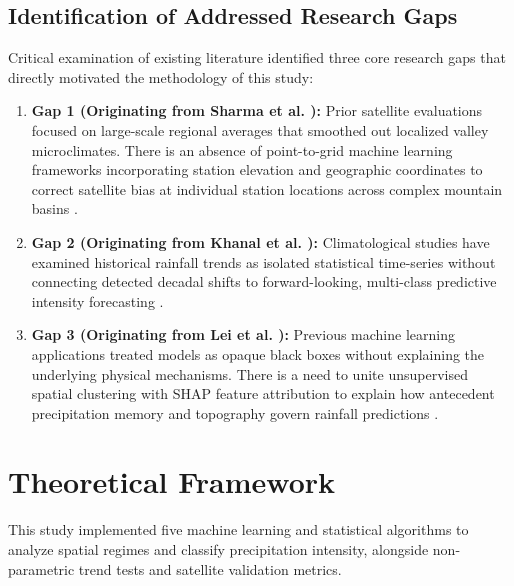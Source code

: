 \documentclass[conference]{IEEEtran}
\begin{document}
\subsection{Identification of Addressed Research Gaps}
Critical examination of existing literature identified three core research gaps that directly motivated the methodology of this study:
\begin{enumerate}
    \item \textbf{Gap 1 (Originating from Sharma et al. \cite{sharma2020}):} Prior satellite evaluations focused on large-scale regional averages that smoothed out localized valley microclimates. There is an absence of point-to-grid machine learning frameworks incorporating station elevation and geographic coordinates to correct satellite bias at individual station locations across complex mountain basins \cite{karki2017}.
    \item \textbf{Gap 2 (Originating from Khanal et al. \cite{khanal2024}):} Climatological studies have examined historical rainfall trends as isolated statistical time-series without connecting detected decadal shifts to forward-looking, multi-class predictive intensity forecasting \cite{zhu2023, callau2023}.
    \item \textbf{Gap 3 (Originating from Lei et al. \cite{lei2025}):} Previous machine learning applications treated models as opaque black boxes without explaining the underlying physical mechanisms. There is a need to unite unsupervised spatial clustering with SHAP feature attribution to explain how antecedent precipitation memory and topography govern rainfall predictions \cite{he2009, talchabhadel2021}.
\end{enumerate}


\section{Theoretical Framework}
\label{sec:theory}
This study implemented five machine learning and statistical algorithms to analyze spatial regimes and classify precipitation intensity, alongside non-parametric trend tests and satellite validation metrics.
\end{document}
